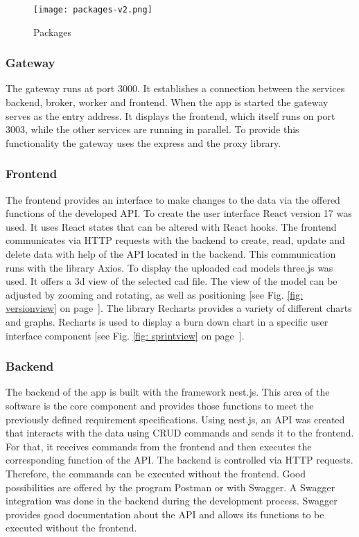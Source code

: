     \begin{figure}[h]
        \centering
        \texttt{[image: packages-v2.png]}
        \caption{Packages}
        \label{fig: packages}
    \end{figure}
    \subsubsection*{Gateway}
    The gateway runs at port 3000. It establishes a connection between the services backend, broker, worker and frontend. When the app is started the gateway serves as the entry address. It displays the frontend, which itself runs on port 3003, while the other services are running in parallel. To provide this functionality the gateway uses the express and the proxy library.  
    \subsubsection*{Frontend}
    The frontend provides an interface to make changes to the data via the offered functions of the developed API. To create the user interface React version 17 was used. It uses React states that can be altered with React hooks. The frontend communicates via HTTP requests with the backend to create, read, update and delete data with help of the API located in the backend. This communication runs with the library Axios. To display the uploaded cad models three.js was used. It offers a 3d view of the selected cad file. The view of the model can be adjusted by zooming and rotating, as well as positioning [see Fig. \ref{fig: versionview} on page~\pageref{fig: versionview}]. The library Recharts provides a variety of different charts and graphs. Recharts is used to display a burn down chart in a specific user interface component [see Fig. \ref{fig: sprintview} on page~\pageref{fig: sprintview}].
    \subsubsection*{Backend}
    The backend of the app is built with the framework nest.js. This area of the software is the core component and provides those functions to meet the previously defined requirement specifications. Using nest.js, an API was created that interacts with the data using CRUD commands and sends it to the frontend. For that, it receives commands from the frontend and then executes the corresponding function of the API. The backend is controlled via HTTP requests. Therefore, the commands can be executed without the frontend. Good possibilities are offered by the program Postman or with Swagger. A Swagger integration was done in the backend during the development process. Swagger provides good documentation about the API and allows its functions to be executed without the frontend.
